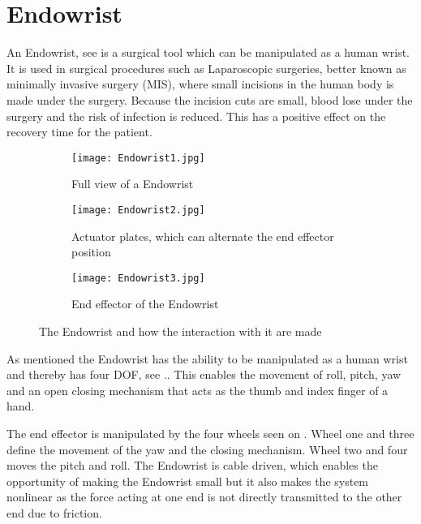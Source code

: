 \section{Endowrist}\label{sec:Endowrist}

An Endowrist, see  is a surgical tool which can be manipulated as a human wrist. It is used in surgical procedures such as Laparoscopic surgeries, better known as minimally invasive surgery (MIS), where small incisions in the human body is made under the surgery. Because the incision cuts are small, blood lose under the surgery and the risk of infection is reduced. This has a positive effect on the recovery time for the patient.


\begin{figure}[H]
	\centering
	\begin{subfigure}{.32\textwidth}
		\centering
		\texttt{[image: Endowrist1.jpg]}
		\caption{Full view of a Endowrist\vspace{8.5mm}   }
		\label{fig:Endo_full}
	\end{subfigure}
	\begin{subfigure}{.32\textwidth}
		\centering
		\texttt{[image: Endowrist2.jpg]}
		\caption{Actuator plates, which can alternate the end effector position}
		\label{fig:Endo_plates}
	\end{subfigure}
	\begin{subfigure}{.32\textwidth}
		\centering
		\texttt{[image: Endowrist3.jpg]}
		\caption{End effector of the Endowrist\newline}
		\label{fig:Endo_end}
	\end{subfigure}
\caption{The Endowrist and how the interaction with it are made}
\label{fig:endowrits_set}
\end{figure}

As mentioned the Endowrist has the ability to be manipulated as a human wrist and thereby has four \gls{DOF}, see .. This enables the movement of roll, pitch, yaw and an open closing mechanism that acts as the thumb and index finger of a hand. 

The end effector is manipulated by the four wheels seen on . Wheel one and three define the movement of the yaw and the closing mechanism. Wheel two and four moves the pitch and roll. The Endowrist is cable driven, which enables the opportunity of making the Endowrist small but it also makes the system nonlinear as the force acting at one end is not directly transmitted to the other end due to friction. 




